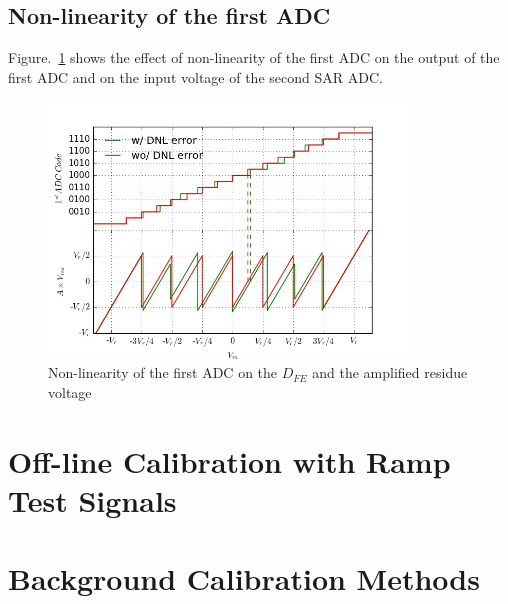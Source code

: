 \documentclass[12pt,a4paper]{article}
\begin{document}
\subsection{Non-linearity of the first ADC}
Figure.~\ref{fig:adc_error} shows the effect of non-linearity of the first ADC on the output of the first ADC and on the input voltage of the second SAR ADC.
\begin{figure}[!h]
	\centering
	\includegraphics[width=0.85\textwidth]{figures/ADC1_dnl.jpg}
	\caption{Non-linearity of the first ADC on the $D_{FE}$ and the amplified residue voltage}
	\label{fig:adc_error}
\end{figure}

\section{Off-line Calibration with Ramp Test Signals} \label{sec:off}

\section{Background Calibration Methods}\label{sec:back}
\end{document}
